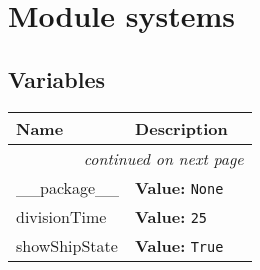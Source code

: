 %
%
%


\section{Module systems}

    \label{systems}


  \subsection{Variables}

    \vspace{-1cm}
\hspace{\varindent}\begin{longtable}{|p{\varnamewidth}|p{\vardescrwidth}|l}
\cline{1-2}
\cline{1-2} \centering \textbf{Name} & \centering \textbf{Description}& \\
\cline{1-2}
\endhead\cline{1-2}\multicolumn{3}{r}{\small\textit{continued on next page}}\\\endfoot\cline{1-2}
\endlastfoot\raggedright \_\-\_\-p\-a\-c\-k\-a\-g\-e\-\_\-\_\- & \raggedright \textbf{Value:} 
{\tt None}&\\
\cline{1-2}
\raggedright d\-i\-v\-i\-s\-i\-o\-n\-T\-i\-m\-e\- & \raggedright \textbf{Value:} 
{\tt 25}&\\
\cline{1-2}
\raggedright s\-h\-o\-w\-S\-h\-i\-p\-S\-t\-a\-t\-e\- & \raggedright \textbf{Value:} 
{\tt True}&\\
\cline{1-2}
\end{longtable}



